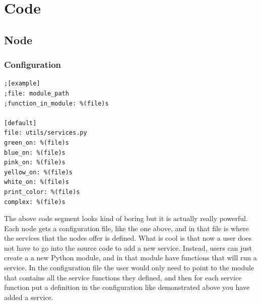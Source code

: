 \documentclass[draftclsnofoot, onecolumn, compsoc, 10pt]{IEEEtran}
\begin{document}
\section{Code}
\lstset{language=Python}
\subsection{Node}
\subsubsection{Configuration}
\begin{lstlisting}
;[example]
;file: module_path
;function_in_module: %(file)s

[default]
file: utils/services.py
green_on: %(file)s
blue_on: %(file)s
pink_on: %(file)s
yellow_on: %(file)s
white_on: %(file)s
print_color: %(file)s
complex: %(file)s
\end{lstlisting}
The above code segment looks kind of boring but it is actually really powerful. Each node gets a configuration file, like the one above, and in that file is where the services that the nodes offer is defined. What is cool is that now a user does not have to go into the source code to add a new service. Instead, users can just create a a new Python module, and in that module have functions that will run a service. In the configuration file the user would only need to point to the module that contains all the service functions they defined, and then for each service function put a definition in the configuration like demonstrated above you have added a service.
\end{document}
